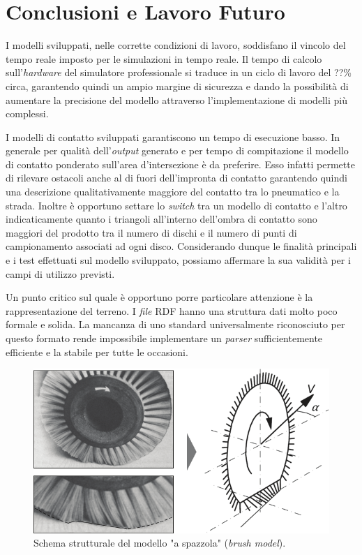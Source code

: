 \chapter{Conclusioni e Lavoro Futuro}
\label{Conclusione}
%
I modelli sviluppati, nelle corrette condizioni di lavoro, soddisfano il vincolo del tempo reale imposto per le simulazioni in tempo reale. Il tempo di calcolo sull'\textit{hardware} del simulatore professionale si traduce in un ciclo di lavoro del ??\% circa, garantendo quindi un ampio margine di sicurezza e dando la possibilità di aumentare la precisione del modello attraverso l'implementazione di modelli più complessi.

I modelli di contatto sviluppati garantiscono un tempo di esecuzione basso. In generale per qualità dell'\textit{output} generato e per tempo di compitazione il modello di contatto ponderato sull'area d'intersezione è da preferire. Esso infatti permette di rilevare ostacoli anche al di fuori dell'impronta di contatto garantendo quindi una descrizione qualitativamente maggiore del contatto tra lo pneumatico e la strada. Inoltre è opportuno settare lo \textit{switch} tra un modello di contatto e l'altro indicaticamente quanto i triangoli all'interno dell'ombra di contatto sono maggiori del prodotto tra il numero di dischi e il numero di punti di campionamento associati ad ogni disco. Considerando dunque le finalità principali e i test effettuati sul modello sviluppato, possiamo affermare la sua validità per i campi di utilizzo previsti.

Un punto critico sul quale è opportuno porre particolare attenzione è la rappresentazione del terreno. I \textit{file} \ac{RDF} hanno una struttura dati molto poco formale e solida. La mancanza di uno standard universalmente riconosciuto per questo formato rende impossibile implementare un \textit{parser} sufficientemente efficiente e la stabile per tutte le occasioni.

\begin{figure}
	\centering
	\includegraphics[width=0.7\linewidth]{Figures/brush_model}
	\caption{Schema strutturale del modello "a spazzola" (\textit{brush model}). }
	\label{brushmodel}
\end{figure}

